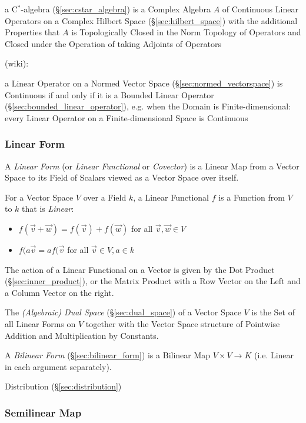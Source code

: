 a C$^*$-algebra (\S\ref{sec:cstar_algebra}) is a Complex Algebra $A$
of Continuous Linear Operators on a Complex Hilbert Space
(\S\ref{sec:hilbert_space}) with the additional Properties that $A$ is
Topologically Closed in the Norm Topology of Operators and Closed
under the Operation of taking Adjoints of Operators

(wiki):

a Linear Operator on a Normed Vector Space
(\S\ref{sec:normed_vectorspace}) is Continuous if and only if it is a
Bounded Linear Operator (\S\ref{sec:bounded_linear_operator}), e.g.
when the Domain is Finite-dimensional: every Linear Operator on a
Finite-dimensional Space is Continuous



\subsubsection{Linear Form}\label{sec:linear_form}

A \emph{Linear Form} (or \emph{Linear Functional} or \emph{Covector}) is a
Linear Map from a Vector Space to its Field of Scalars viewed as a Vector Space
over itself.

For a Vector Space $V$ over a Field $k$, a Linear Functional $f$ is a Function
from $V$ to $k$ that is \emph{Linear}:
\begin{itemize}
\item $f(\vec{v} + \vec{w}) = f(\vec{v}) + f(\vec{w})$ for all $\vec{v},
  \vec{w} \in V$
\item $f(a\vec{v} = af(\vec{v}$ for all $\vec{v} \in V, a \in k$
\end{itemize}

The action of a Linear Functional on a Vector is given by the Dot Product
(\S\ref{sec:inner_product}), or the Matrix Product with a Row Vector on the
Left and a Column Vector on the right.

The \emph{(Algebraic) Dual Space} (\S\ref{sec:dual_space}) of a Vector Space
$V$ is the Set of all Linear Forms on $V$ together with the Vector Space
structure of Pointwise Addition and Multiplication by Constants.

A \emph{Bilinear Form} (\S\ref{sec:bilinear_form}) is a Bilinear Map $V \times
V \rightarrow K$ (i.e. Linear in each argument separately).

Distribution (\S\ref{sec:distribution})



\subsubsection{Semilinear Map}\label{sec:semilinear_map}

